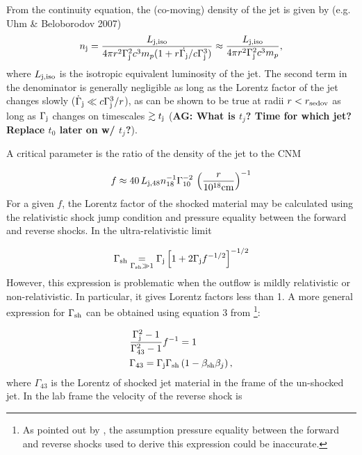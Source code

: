 \documentclass[usenatbib,fleqn]{mnras}
\begin{document}
From the continuity equation, the (co-moving) density of the jet is
given by (e.g. Uhm \& Beloborodov 2007)
 \begin{align}
   n_{\rm j} =  \frac{L_{\rm j, iso}}{4 \pi r^{2}\Gamma_{\rm
       j}^{2}c^{3}m_p(1 + r \dot{\Gamma_{\rm j}}/c\Gamma_{\rm j}^{3})}
   \approx  \frac{L_{\rm j, iso}}{4 \pi r^{2}\Gamma_{\rm j}^{2}c^{3}m_p},
\end{align}
%
where $L_{\rm j, iso}$ is the isotropic equivalent luminosity of the
jet. The second term in the denominator is generally negligible as
long as the Lorentz factor of the jet changes slowly
($\dot{\Gamma}_{\rm j} \ll c\Gamma_{\rm j}^{3}/r$), as can be shown to
be true at radii $r < r_{\rm sedov}$ as long as $\Gamma_{\rm j}$
changes on timescales $\gtrsim t_{\rm j}$ ({\bf AG: What is $t_j$?
  Time for which jet? Replace $t_0$ later on w/ $t_j$?}).

A critical parameter is the ratio of the density of the jet to the
CNM

\begin{equation}
  f\approx 40\,  L_{\rm j,48} n_{18}^{-1} \Gamma_{10}^{-2} \, \left(\frac{r}{10^{18} {\rm
        cm}}\right)^{-1} 
\end{equation}
%
For a given $f$, the Lorentz factor of the shocked material may be
calculated using the relativistic shock jump condition and pressure
equality between the forward and reverse shocks. In the
ultra-relativistic limit 

\begin{equation}
\Gamma_{\rm sh} \underset{\Gamma_{\rm sh} \gg 1}= \Gamma_{\rm j}\left[1 + 2\Gamma_{\rm j}f^{-1/2}\right]^{-1/2}
\end{equation}
%
However, this expression is problematic when the outflow is mildly
relativistic or non-relativistic. In particular, it gives Lorentz
factors less than 1. A more general expression for $\Gamma_{\rm sh}$
can be obtained using equation 3 from
\citet{Beloborodov&Uhm2006}\footnote{As pointed out by
  \citet{Beloborodov&Uhm2006}, the assumption pressure equality
  between the forward and reverse shocks used to derive this
  expression could be inaccurate.}:

\begin{align}
&\frac{\Gamma_{\rm j}^2-1}{\Gamma_{43}^2-1} f^{-1}=1\\
&\Gamma_{43}=\Gamma_{\rm j} \Gamma_{\rm sh} \left(1-\beta_{\rm sh} \beta_j\right),
\label{eq:gammaShGen}
\end{align}
%
where $\Gamma_{43}$ is the Lorentz of shocked jet material in the
frame of the un-shocked jet. In the lab frame the velocity of the
reverse shock is
\end{document}
